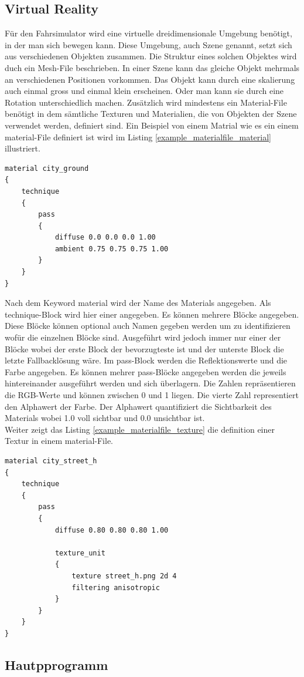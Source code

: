 \subsection{Virtual Reality}
Für den Fahrsimulator wird eine virtuelle dreidimensionale Umgebung benötigt, in der man sich bewegen kann. Diese Umgebung, auch Szene genannt, setzt sich aus verschiedenen Objekten zusammen. Die Struktur eines solchen Objektes wird duch ein Mesh-File beschrieben. In einer Szene kann das gleiche Objekt mehrmals an verschiedenen Positionen vorkommen. Das Objekt kann durch eine skalierung auch einmal gross und einmal klein erscheinen. Oder man kann sie durch eine Rotation unterschiedlich machen. Zusätzlich wird mindestens ein Material-File benötigt in dem sämtliche Texturen und Materialien, die von Objekten der Szene verwendet werden, definiert sind.
Ein Beispiel von einem Matrial wie es ein einem material-File definiert ist wird im Listing \ref{example_materialfile_material} illustriert.
\begin{lstlisting}[caption={Beispiel aus dem material-File für ein Material},label={example_materialfile_material}]
material city_ground
{
	technique
	{
		pass
		{
			diffuse 0.0 0.0 0.0 1.00
			ambient 0.75 0.75 0.75 1.00	
		}
	}
}
\end{lstlisting}
Nach dem Keyword material wird der Name des Materials angegeben. Als technique-Block wird hier einer angegeben. Es können mehrere Blöcke angegeben. Diese Blöcke können optional auch Namen gegeben werden um zu identifizieren wofür die einzelnen Blöcke sind. Ausgeführt wird jedoch immer nur einer der Blöcke wobei der erste Block der bevorzugteste ist und der unterste Block die letzte Fallbacklösung wäre. Im pass-Block werden die Reflektionswerte und die Farbe angegeben. Es können mehrer pass-Blöcke angegeben werden die jeweils hintereinander ausgeführt werden und sich überlagern. Die Zahlen repräsentieren die RGB-Werte und können zwischen 0 und 1 liegen. Die vierte Zahl representiert den Alphawert der Farbe. Der Alphawert quantifiziert die Sichtbarkeit des Materials wobei 1.0 voll sichtbar und 0.0 unsichtbar ist. \\

Weiter zeigt das Listing \ref{example_materialfile_texture} die definition einer Textur in einem material-File.
\begin{lstlisting}[caption={Beispiel aus dem material-File für eine Textur},label={example_materialfile_texture}]
material city_street_h
{
	technique
	{
		pass
		{
			diffuse 0.80 0.80 0.80 1.00
			
			texture_unit
			{
				texture street_h.png 2d 4
				filtering anisotropic
			}
		}
	}
}

\end{lstlisting}

\subsection{Hautpprogramm}




